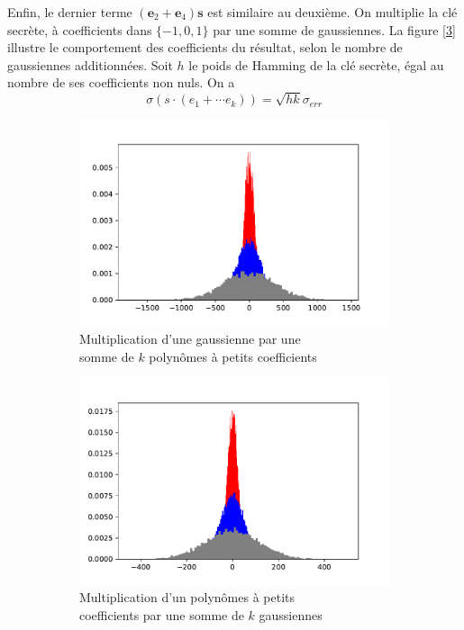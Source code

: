 \documentclass[11pt, headsepline, a4paper, fleqn, oneside]{article}
\begin{document}
Enfin, le dernier terme $(\boldsymbol{e}_{2} + \boldsymbol{e}_{4})\boldsymbol{s}$ est similaire au deuxième. On multiplie la clé secrète, à coefficients dans $\{-1,0,1\}$ par une somme de gaussiennes. La figure [\ref{fig4-b}] illustre le comportement des coefficients du résultat, selon le nombre de gaussiennes additionnées. Soit $h$ le poids de Hamming de la clé secrète, égal au nombre de ses coefficients non nuls. On a 
$$\sigma(s\cdot(e_1 + \cdots e_k)) = \sqrt{hk}\sigma_{err}$$ 

\begin{figure}[ht]
  \centering
  \begin{subfigure}[b]{0.48\linewidth}
    \includegraphics[width=\linewidth]{add2.pdf}
    \caption{\footnotesize{Multiplication d'une gaussienne par une\\ somme de $k$ polynômes à petits coefficients}}
    \label{fig4-a}
  \end{subfigure}
  \begin{subfigure}[b]{0.48\linewidth}
    \includegraphics[width=\linewidth]{mul_key.pdf}
    \caption{\footnotesize{Multiplication d'un polynômes à petits\\ coefficients par une somme de $k$ gaussiennes}}
    \label{fig4-b}
  \end{subfigure}
\caption{}
\end{figure}
\end{document}
